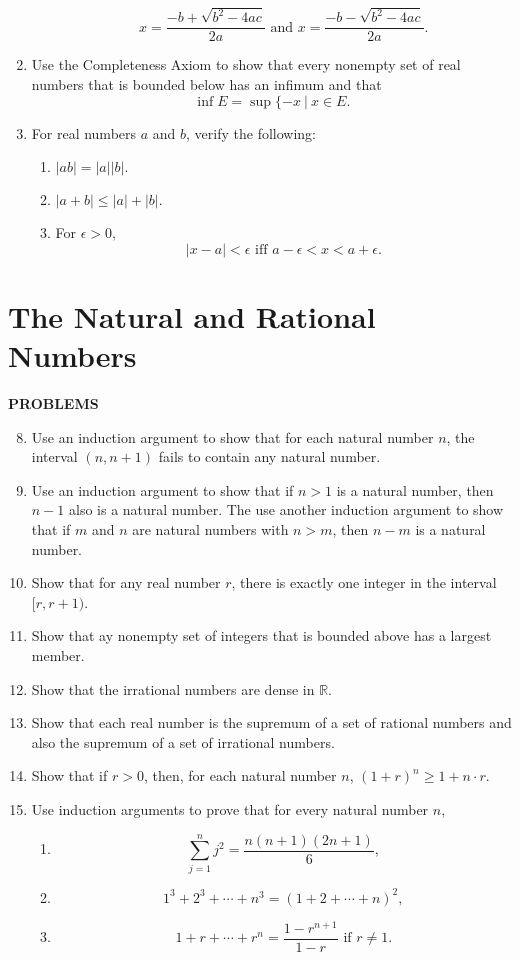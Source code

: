 \documentclass[a4paper,10pt]{book}
\theoremstyle{plain} %
\begin{document}
\begin{enumerate}
\begin{enumerate}[label=(\roman*),align=left]
		\[  x = \dfrac{-b + \sqrt{b^2-4ac}}{2a} \text{  and  } x = \dfrac{-b - \sqrt{b^2-4ac}}{2a}. \]
	\end{enumerate}
	\item Use the Completeness Axiom to show that every nonempty set of real numbers that is bounded below has an infimum and that
	\[\inf E =\sup \{-x \ |\ x \in E.\]
	\item For real numbers $a$ and $b$, verify the following:
	\begin{enumerate}[label=(\roman*),align=left]
		\item $|ab| = |a||b|.$
		\item $|a+b| \le |a|+|b|.$
		\item For $\epsilon >0,$
		\[ |x-a| < \epsilon \text{  iff  } a - \epsilon < x < a + \epsilon.\]
	\end{enumerate}
\end{enumerate}

\section{The Natural and Rational Numbers}

\begin{center}
	\textbf{PROBLEMS}
\end{center}
\begin{enumerate}
	\setcounter{enumi}{7}
	\item Use an induction argument to show that for each natural number $n$, the interval $(n, n+1)$ fails to contain any natural number.
	\item Use an induction argument to show that if $n>1$ is a natural number, then $n-1$ also is a natural number. The use another induction argument to show that if $m$ and $n$ are natural numbers with $n>m$, then $n-m$ is a natural number.
	\item Show that for any real number $r$, there is exactly one integer in the interval $[r,r+1)$.
	\item Show that ay nonempty set of integers that is bounded above has a largest member.
	\item Show that the irrational numbers are dense in $\mathbb{R}$.
	\item Show that each real number is the supremum of a set of rational numbers and also the supremum of a set of irrational numbers.
	\item Show that if $r>0$, then, for each natural number $n$, $(1+r)^n \ge 1+n \cdot r$.
	\item Use induction arguments to prove that for every natural number $n$,
	\begin{enumerate}[label=(\roman*),align=left]
        \item \[ \sum_{j=1}^n j^2 = \dfrac{n(n+1)(2n+1)}{6}, \]
        \item \[ 1^3 + 2^3 + \cdots + n^3 = (1+2+\cdots +n)^2, \]
        \item \[ 1+r+\cdots +r^n = \dfrac{1-r^{n+1}}{1-r} \text{ if } r \neq 1.\]
    \end{enumerate}
\end{enumerate}
\end{document}
